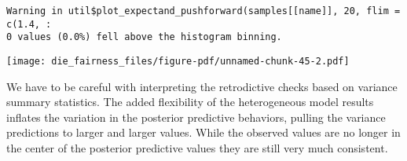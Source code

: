 \documentclass[
  letterpaper,
  DIV=11,
  numbers=noendperiod]{scrartcl}
\newenvironment{Shaded}{\begin{snugshade}}{\end{snugshade}}
\newcommand{\AttributeTok}[1]{\textcolor[rgb]{0.40,0.45,0.13}{#1}}
\newcommand{\ControlFlowTok}[1]{\textcolor[rgb]{0.00,0.23,0.31}{#1}}
\newcommand{\DecValTok}[1]{\textcolor[rgb]{0.68,0.00,0.00}{#1}}
\newcommand{\FloatTok}[1]{\textcolor[rgb]{0.68,0.00,0.00}{#1}}
\newcommand{\FunctionTok}[1]{\textcolor[rgb]{0.28,0.35,0.67}{#1}}
\newcommand{\NormalTok}[1]{\textcolor[rgb]{0.00,0.23,0.31}{#1}}
\newcommand{\OtherTok}[1]{\textcolor[rgb]{0.00,0.23,0.31}{#1}}
\newcommand{\SpecialCharTok}[1]{\textcolor[rgb]{0.37,0.37,0.37}{#1}}
\newcommand{\StringTok}[1]{\textcolor[rgb]{0.13,0.47,0.30}{#1}}
\begin{document}
\begin{verbatim}
Warning in util$plot_expectand_pushforward(samples[[name]], 20, flim = c(1.4, :
0 values (0.0%) fell above the histogram binning.
\end{verbatim}

\texttt{[image: die\_fairness\_files/figure-pdf/unnamed-chunk-45-2.pdf]}

We have to be careful with interpreting the retrodictive checks based on
variance summary statistics. The added flexibility of the heterogeneous
model results inflates the variation in the posterior predictive
behaviors, pulling the variance predictions to larger and larger values.
While the observed values are no longer in the center of the posterior
predictive values they are still very much consistent.

\begin{Shaded}
\end{Shaded}
\end{document}
